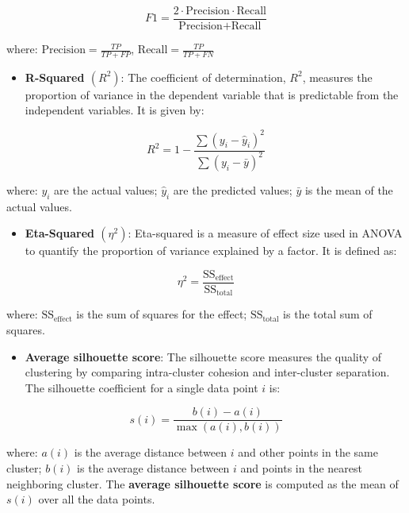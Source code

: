 \documentclass[preprint,
3p]{elsarticle} %
\providecommand{\tightlist}{%
  \setlength{\itemsep}{0pt}\setlength{\parskip}{0pt}}
\begin{document}
\begin{appendices}
\begin{equation}
   F1 = \frac{2 \cdot \text{Precision} \cdot \text{Recall}}{\text{Precision} + \text{Recall}}
\end{equation}

\noindent where: \(\text{Precision} = \frac{TP}{TP + FP}\),
\(\text{Recall} = \frac{TP}{TP + FN}\)

\begin{itemize}
\tightlist
\item
  \textbf{R-Squared \((R^2)\)}: The coefficient of determination,
  \(R^2\), measures the proportion of variance in the dependent variable
  that is predictable from the independent variables. It is given by:
\end{itemize}

\begin{equation}
 R^2 = 1 - \frac{\sum (y_i - \hat{y}_i)^2}{\sum (y_i - \bar{y})^2}
\end{equation}

\noindent where: \(y_i\) are the actual values; \(\hat{y}_i\) are the
predicted values; \(\bar{y}\) is the mean of the actual values.

\begin{itemize}
\tightlist
\item
  \textbf{Eta-Squared \((\eta^2)\)}: Eta-squared is a measure of effect
  size used in ANOVA to quantify the proportion of variance explained by
  a factor. It is defined as:
\end{itemize}

\begin{equation}
 \eta^2 = \frac{\text{SS}_{\text{effect}}}{\text{SS}_{\text{total}}}
\end{equation}

\noindent where: \(\text{SS}_{\text{effect}}\) is the sum of squares for
the effect; \(\text{SS}_{\text{total}}\) is the total sum of squares.

\begin{itemize}
\tightlist
\item
  \textbf{Average silhouette score}: The silhouette score measures the
  quality of clustering by comparing intra-cluster cohesion and
  inter-cluster separation. The silhouette coefficient for a single data
  point \(i\) is:
\end{itemize}

\begin{equation}
 s(i) = \frac{b(i) - a(i)}{\max(a(i), b(i))}
\end{equation}

\noindent where: \(a(i)\) is the average distance between \(i\) and
other points in the same cluster; \(b(i)\) is the average distance
between \(i\) and points in the nearest neighboring cluster. The
\textbf{average silhouette score} is computed as the mean of \(s(i)\)
over all the data points.

\end{appendices}


\end{document}
